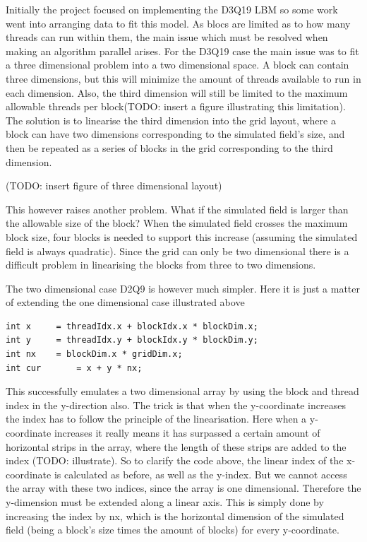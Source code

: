 
Initially the project focused on implementing the D3Q19 LBM so some work went into arranging data to fit this model. As blocs are limited as to how many threads can run within them, the main issue which must be resolved when making an algorithm parallel arises. For the D3Q19 case the main issue was to fit a three dimensional problem into a two dimensional space. A block can contain three dimensions, but this will minimize the amount of threads available to run in each dimension. Also, the third dimension will still be limited to the maximum allowable threads per block(TODO: insert a figure illustrating this limitation). The solution is to linearise the third dimension into the grid layout, where a block can have two dimensions corresponding to the simulated field's size, and then be repeated as a series of blocks in the grid corresponding to the third dimension.

(TODO: insert figure of three dimensional layout)

This however raises another problem. What if the simulated field is larger than the allowable size of the block? When the simulated field crosses the maximum block size, four blocks is needed to support this increase (assuming the simulated field is always quadratic). Since the grid can only be two dimensional there is a difficult problem in linearising the blocks from three to two dimensions.

The two dimensional case D2Q9 is however much simpler. Here it is just a matter of extending the one dimensional case illustrated above

\begin{verbatim}
int x     = threadIdx.x + blockIdx.x * blockDim.x;
int y     = threadIdx.y + blockIdx.y * blockDim.y;
int nx    = blockDim.x * gridDim.x;
int cur 	  = x + y * nx;
\end{verbatim}

This successfully emulates a two dimensional array by using the block and thread index in the y-direction also. The trick is that when the y-coordinate increases the index has to follow the principle of the linearisation. Here when a y-coordinate increases it really means it has surpassed a certain amount of horizontal strips in the array, where the length of these strips are added to the index (TODO: illustrate). So to clarify the code above, the linear index of the x-coordinate is calculated as before, as well as the y-index. But we cannot access the array with these two indices, since the array is one dimensional. Therefore the y-dimension must be extended along a linear axis. This is simply done by increasing the index by nx, which is the horizontal dimension of the simulated field (being a block's size times the amount of blocks) for every y-coordinate.

